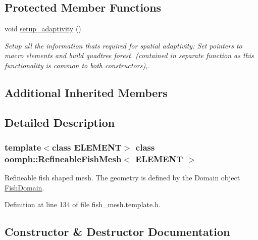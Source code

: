 \subsection*{Protected Member Functions}
\begin{DoxyCompactItemize}
\item 
void \hyperlink{classoomph_1_1RefineableFishMesh_a1fb10f94f78c7a4e37113fbf4c72f00c}{setup\+\_\+adaptivity} ()
\begin{DoxyCompactList}\small\item\em Setup all the information that\textquotesingle{}s required for spatial adaptivity\+: Set pointers to macro elements and build quadtree forest. (contained in separate function as this functionality is common to both constructors),. \end{DoxyCompactList}\end{DoxyCompactItemize}
\subsection*{Additional Inherited Members}


\subsection{Detailed Description}
\subsubsection*{template$<$class E\+L\+E\+M\+E\+NT$>$\newline
class oomph\+::\+Refineable\+Fish\+Mesh$<$ E\+L\+E\+M\+E\+N\+T $>$}

Refineable fish shaped mesh. The geometry is defined by the Domain object \hyperlink{classoomph_1_1FishDomain}{Fish\+Domain}. 

Definition at line 134 of file fish\+\_\+mesh.\+template.\+h.



\subsection{Constructor \& Destructor Documentation}
\mbox{\label{classoomph_1_1RefineableFishMesh_a7f31e65306286e83a5d17459bae9163d}} 
